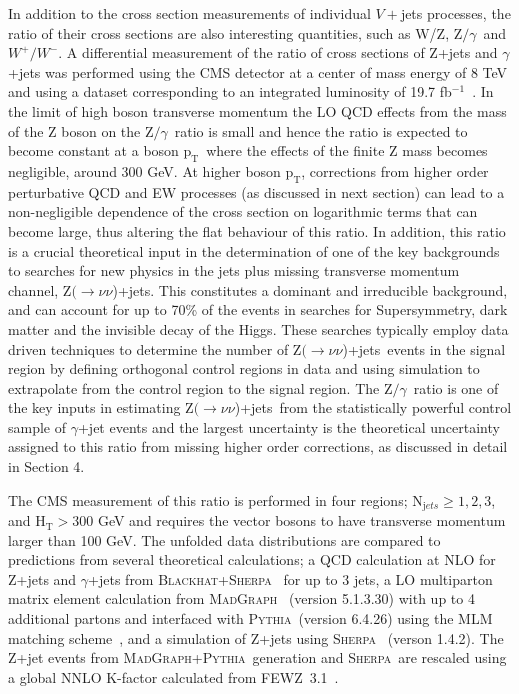 \documentclass[a4paper,11pt,notoc]{article}
\newcommand{\Znunuj}   {\mbox{${\mathrm Z}(\rightarrow\nu \nu$)+jets}}
\newcommand{\pt}{\ensuremath{\mathrm{p_T}}}
\newcommand{\Ht}{\ensuremath{\mathrm{H_T}}}
\newcommand{\PYTHIA}{\textsc{Pythia}}
\newcommand{\SHERPA}{\textsc{Sherpa}}
\newcommand{\BLACKHAT}{\textsc{Blackhat}}
\newcommand{\FEWZ}{\textsc{FEWZ}}
\newcommand{\MADGRAPH}{\textsc{MadGraph}}
\newcommand{\zgamma}{\mbox{${\mathrm Z/\gamma}$}}
\begin{document}
In addition to the cross section measurements of individual $V+$jets processes, the ratio of their cross sections are also interesting quantities, such as W/Z, \zgamma\ and $W^{+}/W^{-}$.
A differential measurement of the ratio of cross sections of Z+jets and $\gamma$+jets was performed using the CMS detector at a center of mass energy of 8 TeV and using a dataset corresponding to an integrated luminosity of 19.7 fb$^{-1}$~\cite{Khachatryan:2015ira}. 
In the limit of high boson transverse momentum the LO QCD effects from the mass of the Z boson on the \zgamma\ ratio is small and hence the ratio is expected to become constant at a boson \pt\ where the effects of the finite Z mass becomes negligible, around 300 GeV. At higher boson \pt, corrections from higher order perturbative QCD and EW processes (as discussed in next section) can lead to a non-negligible dependence of the cross section on logarithmic terms that can become large, thus altering the flat behaviour of this ratio. 
In addition, this ratio is a crucial theoretical input in the determination of one of the key backgrounds to searches for new physics in the jets plus missing transverse momentum channel, \Znunuj. This constitutes a dominant and irreducible background, and can account for up to 70\% of the events in searches for Supersymmetry, dark matter and the invisible decay of the Higgs. These searches typically employ data driven techniques to determine the number of \Znunuj\ events in the signal region by defining orthogonal control regions in data and using simulation to extrapolate from the control region to the signal region. The \zgamma\ ratio is one of the key inputs in estimating \Znunuj\ from the statistically powerful control sample of $\gamma$+jet events and the largest uncertainty is the theoretical uncertainty assigned to this ratio from missing higher order corrections, as discussed in detail in Section 4. 

The CMS measurement of this ratio is performed in four regions; N$_{\mathrm jets} \ge 1, 2, 3$, and $\Ht > 300$ GeV and requires the vector bosons to have transverse momentum larger than 100 GeV. The unfolded data distributions are compared to predictions from several theoretical calculations; a QCD calculation at NLO for Z+jets and $\gamma$+jets from \BLACKHAT+\SHERPA~\cite{Bern:2012vx} for up to 3 jets, a LO multiparton matrix element calculation from \MADGRAPH~\cite{Alwall:2011uj} (version 5.1.3.30) with up to 4 additional partons and interfaced with \PYTHIA\ (version 6.4.26) using the MLM matching scheme~\cite{Alwall:2007fs}, and a simulation of Z+jets using \SHERPA~\cite{Gleisberg:2008ta} (verson 1.4.2).   
The Z+jet events from \MADGRAPH+\PYTHIA\ generation and \SHERPA\ are rescaled using a global NNLO K-factor calculated from \FEWZ\ 3.1~\cite{Gavin:2010az}.
\end{document}
